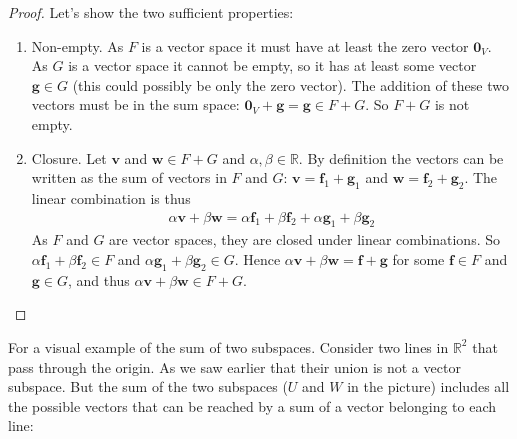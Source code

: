 


\begin{proof} Let's show the two sufficient properties:
\begin{enumerate}
\item Non-empty. As $F$ is a vector space it must have at least the zero vector $\textbf{0}_V$. As $G$ is a vector space it cannot be empty, so it has at least some vector $\textbf{g}\in G$ (this could possibly be only the zero vector). The addition of these two vectors must be in the sum space: $\textbf{0}_V+\textbf{g}=\textbf{g}\in F+G$. So $F+G$ is not empty.

\item Closure. Let $\textbf{v}$ and $\textbf{w} \in F+G$ and $\alpha,\beta \in \mathbb{R}$. By definition the vectors can be written as the sum of vectors in $F$ and $G$: $\textbf{v}=\textbf{f}_1+\textbf{g}_1$ and $\textbf{w}=\textbf{f}_2+\textbf{g}_2$. The linear combination is thus
\begin{align*}
\alpha \textbf{v} + \beta \textbf{w} = \alpha\textbf{f}_1+\beta\textbf{f}_2+\alpha\textbf{g}_1+\beta\textbf{g}_2
\end{align*}
As $F$ and $G$ are vector spaces, they are closed under linear combinations. So $\alpha\textbf{f}_1+\beta\textbf{f}_2\in F$ and $\alpha\textbf{g}_1+\beta\textbf{g}_2 \in G$. Hence $\alpha \textbf{v} + \beta \textbf{w} = \textbf{f} + \textbf{g}$ for some $\textbf{f}\in F$ and $\textbf{g}\in G$, and thus $\alpha \textbf{v} + \beta \textbf{w} \in F+G$.
\end{enumerate}
\end{proof}


\noindent For a visual example of the sum of two subspaces. Consider two lines in $\mathbb{R}^2$ that pass through the origin. As we saw earlier that their union is not a vector subspace. But the sum of the two subspaces ($U$ and $W$ in the picture) includes all the possible vectors that can be reached by a sum of a vector belonging to each line:

